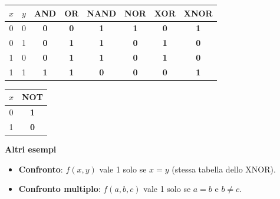 \documentclass[12pt, a4paper]{article}
\begin{document}
\begin{center}
\renewcommand{\arraystretch}{1.25}
\begin{tabular}[t]{|cc||cccccc|}
\hline
\colorbox{gray!25}{\color{black}$x$} & \colorbox{gray!25}{\color{black}$y$} & \colorbox{gray!25}{\color{black}\textbf{AND}} & \colorbox{gray!25}{\color{black}\textbf{OR}} & \colorbox{gray!25}{\color{black}\textbf{NAND}} & \colorbox{gray!25}{\color{black}\textbf{NOR}} & \colorbox{gray!25}{\color{black}\textbf{XOR}} & \colorbox{gray!25}{\color{black}\textbf{XNOR}} \\ \hline
0 & 0 & \textbf{0} & \textbf{0} & \textbf{1} & \textbf{1} & \textbf{0} & \textbf{1} \\ \hline
0 & 1 & \textbf{0} & \textbf{1} & \textbf{1} & \textbf{0} & \textbf{1} & \textbf{0} \\ \hline
1 & 0 & \textbf{0} & \textbf{1} & \textbf{1} & \textbf{0} & \textbf{1} & \textbf{0} \\ \hline
1 & 1 & \textbf{1} & \textbf{1} & \textbf{0} & \textbf{0} & \textbf{0} & \textbf{1} \\ \hline
\end{tabular}
\qquad
\begin{tabular}[t]{|c||c|}
\hline
\colorbox{gray!25}{\color{black}$x$} & \colorbox{gray!25}{\color{black}\textbf{NOT}} \\ \hline
0 & \textbf{1} \\ \hline
1 & \textbf{0} \\ \hline
\end{tabular}
\end{center}

\textbf{Altri esempi}
\begin{itemize}
    \item \textbf{Confronto}: $f(x, y)$ vale 1 solo se $x = y$ (stessa tabella dello XNOR).
    \item \textbf{Confronto multiplo}: $f(a, b, c)$ vale 1 solo se $a = b$ e $b \neq c$.
\end{itemize}
\end{document}
